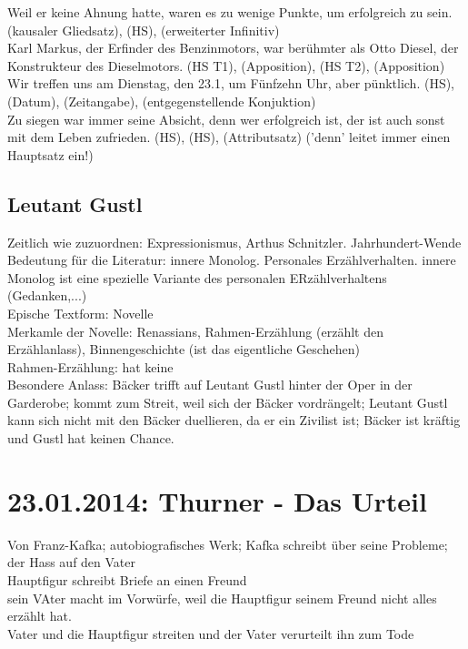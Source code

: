 \documentclass[a4paper]{article}
\begin{document}
Weil er keine Ahnung hatte, waren es zu wenige Punkte, um erfolgreich zu sein. (kausaler Gliedsatz), (HS), (erweiterter Infinitiv)\\
Karl Markus, der Erfinder des Benzinmotors, war berühmter als Otto Diesel, der Konstrukteur des Dieselmotors. (HS T1), (Apposition), (HS T2), (Apposition)\\
Wir treffen uns am Dienstag, den 23.1, um Fünfzehn Uhr, aber pünktlich. (HS), (Datum), (Zeitangabe), (entgegenstellende Konjuktion)\\
Zu siegen war immer seine Absicht, denn wer erfolgreich ist, der ist auch sonst mit dem Leben zufrieden. (HS), (HS), (Attributsatz) ('denn' leitet immer einen Hauptsatz ein!)

\subsection{Leutant Gustl}

Zeitlich wie zuzuordnen: Expressionismus, Arthus Schnitzler. Jahrhundert-Wende\\
Bedeutung für die Literatur: innere Monolog. Personales Erzählverhalten. innere Monolog ist eine spezielle Variante des personalen ERzählverhaltens (Gedanken,...)\\
Epische Textform: Novelle\\
Merkamle der Novelle: Renassians, Rahmen-Erzählung (erzählt den Erzählanlass), Binnengeschichte (ist das eigentliche Geschehen)\\
Rahmen-Erzählung: hat keine\\
Besondere Anlass: Bäcker trifft auf Leutant Gustl hinter der Oper in der Garderobe; kommt zum Streit, weil sich der Bäcker vordrängelt; Leutant Gustl kann sich nicht mit den Bäcker duellieren, da er ein Zivilist ist; Bäcker ist kräftig und Gustl hat keinen Chance.  

\section{23.01.2014: Thurner - Das Urteil}

Von Franz-Kafka; autobiografisches Werk; Kafka schreibt über seine Probleme; der Hass auf den Vater\\
Hauptfigur schreibt Briefe an einen Freund\\
sein VAter macht im Vorwürfe, weil die Hauptfigur seinem Freund nicht alles erzählt hat.\\
Vater und die Hauptfigur streiten und der Vater verurteilt ihn zum Tode
\end{document}
